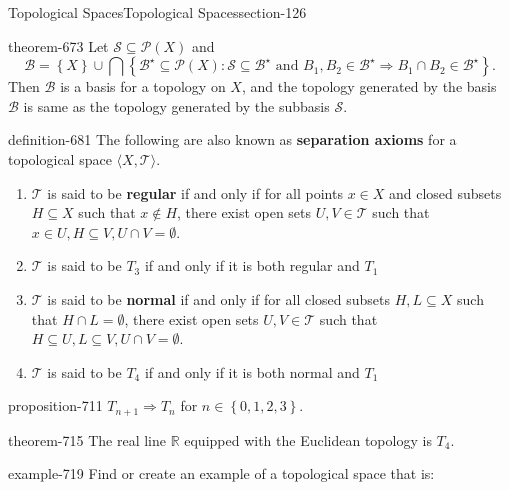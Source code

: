 \documentclass[oneside,10pt,]{article}
\newcommand{\terminology}[1]{\textbf{#1}}
\newcommand{\tuple}[1]{\langle #1 \rangle}
\newcommand{\mb}{\mathbb}
\newcommand{\mc}{\mathcal}
\newcommand{\setBuilder}[2]{\left\{#1:#2\right\}}
\newcommand{\setList}[1]{\left\{#1\right\}}
\begin{document}
\begin{sectionptx}{Topological Spaces}{}{Topological Spaces}{}{}{section-126}
\begin{theorem}{}{}{theorem-673}%
\hypertarget{p-674}{}%
Let \(\mc S\subseteq\mc P(X)\) and%
\begin{equation*}
\mc B=\setList{X}\cup\bigcap\setBuilder{\mc B^\star\subseteq\mc P(X)}
{\mc S\subseteq\mc B^\star\text{ and }
B_1,B_2\in\mc B^\star\Rightarrow B_1\cap B_2\in\mc B^\star}.
\end{equation*}
Then \(\mc B\) is a basis for a topology on \(X\), and the topology generated by the basis \(\mc B\) is same as the topology generated by the subbasis \(\mc S\).%
\end{theorem}
\begin{definition}{}{definition-681}%
\hypertarget{p-682}{}%
The following are also known as \terminology{separation axioms} for a topological space \(\tuple{X,\mc T}\).%
\leavevmode%
\begin{enumerate}
\item\hypertarget{li-686}{}\(\mc T\) is said to be \terminology{regular} if and only if for all points \(x\in X\) and closed subsets \(H\subseteq X\) such that \(x\not\in H\), there exist open sets \(U,V\in\mc T\) such that \(x\in U,H\subseteq V,U\cap V=\emptyset\).%
\item\hypertarget{li-694}{}\(\mc T\) is said to be \terminology{\(T_3\)} if and only if it is both regular and \(T_1\)%
\item\hypertarget{li-699}{}\(\mc T\) is said to be \terminology{normal} if and only if for all closed subsets \(H,L\subseteq X\) such that \(H\cap L=\emptyset\), there exist open sets \(U,V\in\mc T\) such that \(H\subseteq U,L\subseteq V,U\cap V=\emptyset\).%
\item\hypertarget{li-706}{}\(\mc T\) is said to be \terminology{\(T_4\)} if and only if it is both normal and \(T_1\)%
\end{enumerate}
\end{definition}
\begin{proposition}{}{}{proposition-711}%
\hypertarget{p-712}{}%
\(T_{n+1}\Rightarrow T_n\) for \(n\in\setList{0,1,2,3}\).%
\end{proposition}
\begin{theorem}{}{}{theorem-715}%
\hypertarget{p-716}{}%
The real line \(\mb R\) equipped with the Euclidean topology is \(T_4\).%
\end{theorem}
\begin{example}{}{example-719}%
\hypertarget{p-720}{}%
Find or create an example of a topological space that is:%
\leavevmode%
\begin{enumerate}

\end{enumerate}
\end{example}
\end{sectionptx}
\end{document}
